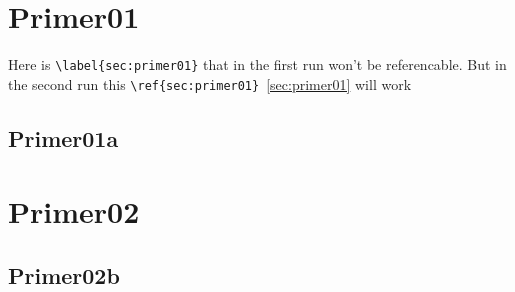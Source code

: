 \documentclass[12pt]{article}
\begin{document}
\section{Primer01}
Here is \verb|\label{sec:primer01}| \label{sec:primer01}  that in the first run won't be referencable. But in the second run this \verb|\ref{sec:primer01}|~\ref{sec:primer01} will work

\subsection{Primer01a}

\section{Primer02}

\subsection{Primer02b}
\label{sec:primer02}
\end{document}
